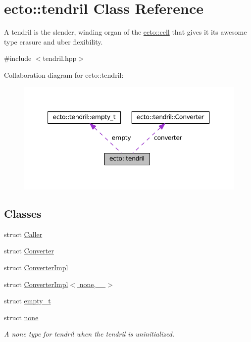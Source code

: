 \hypertarget{classecto_1_1tendril}{\section{ecto\-:\-:tendril Class Reference}
\label{classecto_1_1tendril}
}


A tendril is the slender, winding organ of the \hyperlink{structecto_1_1cell}{ecto\-::cell} that gives it its awesome type erasure and uber flexibility.  




{\ttfamily \#include $<$tendril.\-hpp$>$}



Collaboration diagram for ecto\-:\-:tendril\-:\nopagebreak
\begin{figure}[H]
\begin{center}
\leavevmode
\includegraphics[width=343pt]{classecto_1_1tendril__coll__graph}
\end{center}
\end{figure}
\subsection*{Classes}
\begin{DoxyCompactItemize}
\item 
struct \hyperlink{structecto_1_1tendril_1_1Caller}{Caller}
\item 
struct \hyperlink{structecto_1_1tendril_1_1Converter}{Converter}
\item 
struct \hyperlink{structecto_1_1tendril_1_1ConverterImpl}{Converter\-Impl}
\item 
struct \hyperlink{structecto_1_1tendril_1_1ConverterImpl_3_01none_00_01___01_4}{Converter\-Impl$<$ none, \-\_\- $>$}
\item 
struct \hyperlink{structecto_1_1tendril_1_1empty__t}{empty\-\_\-t}
\item 
struct \hyperlink{structecto_1_1tendril_1_1none}{none}
\begin{DoxyCompactList}\small\item\em A none type for tendril when the tendril is uninitialized. \end{DoxyCompactList}\end{DoxyCompactItemize}
